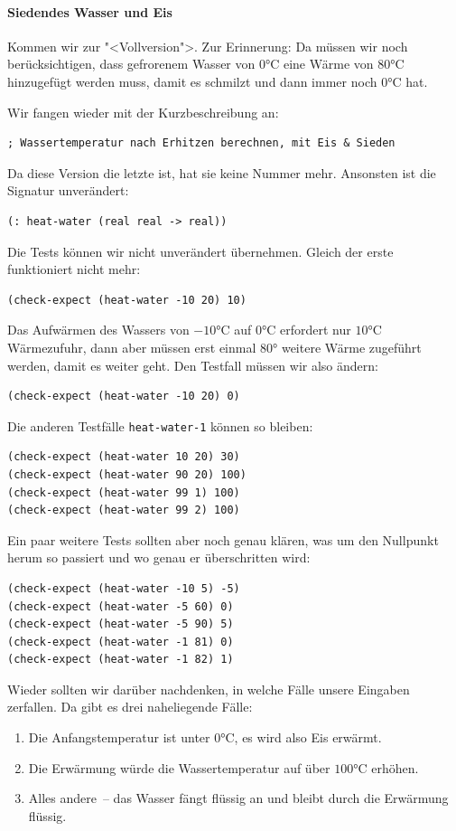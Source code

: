 \paragraph{Siedendes Wasser und Eis} Kommen wir zur "<Vollversion">.
Zur Erinnerung: Da müssen wir noch berücksichtigen, dass gefrorenem
Wasser von 0\si{\degree}C eine Wärme von 80\si{\degree}C hinzugefügt werden muss, damit es
schmilzt und dann immer noch 0\si{\degree}C hat.  

Wir fangen wieder mit der Kurzbeschreibung an:
%
\begin{lstlisting}
; Wassertemperatur nach Erhitzen berechnen, mit Eis & Sieden
\end{lstlisting}
%
Da diese Version die letzte ist, hat sie keine Nummer mehr.  Ansonsten
ist die Signatur unverändert:
%
\begin{lstlisting}
(: heat-water (real real -> real))
\end{lstlisting}
%
Die Tests können wir nicht unverändert übernehmen.  Gleich der erste
funktioniert nicht mehr:
%
\begin{lstlisting}
(check-expect (heat-water -10 20) 10)
\end{lstlisting}
%
Das Aufwärmen des Wassers von $-10$\si{\degree}C auf $0$\si{\degree}C erfordert nur $10$\si{\degree}C
Wärmezufuhr, dann aber müssen erst einmal 80\si{\degree} weitere Wärme zugeführt
werden, damit es weiter geht.  Den Testfall müssen wir also ändern:
%
\begin{lstlisting}
(check-expect (heat-water -10 20) 0)
\end{lstlisting}
%
Die anderen Testfälle \lstinline{heat-water-1} können so bleiben:
%
\begin{lstlisting}
(check-expect (heat-water 10 20) 30)
(check-expect (heat-water 90 20) 100)
(check-expect (heat-water 99 1) 100)
(check-expect (heat-water 99 2) 100)
\end{lstlisting}
%
Ein paar weitere Tests sollten aber noch genau klären, was um den
Nullpunkt herum so passiert und wo genau er überschritten wird:
%
\begin{lstlisting}
(check-expect (heat-water -10 5) -5)
(check-expect (heat-water -5 60) 0)
(check-expect (heat-water -5 90) 5)
(check-expect (heat-water -1 81) 0)
(check-expect (heat-water -1 82) 1)
\end{lstlisting}
%
Wieder sollten wir darüber nachdenken, in welche Fälle unsere
Eingaben zerfallen.  Da gibt es drei naheliegende Fälle:
%
\begin{enumerate}
\item Die Anfangstemperatur ist unter $0$\si{\degree}C, es wird also Eis erwärmt.
\item Die Erwärmung würde die Wassertemperatur auf über $100$\si{\degree}C erhöhen.
\item Alles andere~-- das Wasser fängt flüssig an und bleibt durch die
  Erwärmung flüssig.
\end{enumerate}

